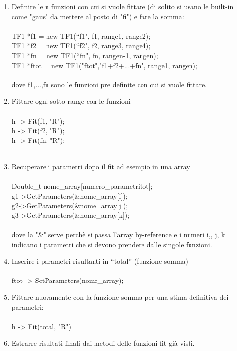 \documentclass[10pt,a4paper]{article}
\begin{document}
\begin{enumerate}
	\item Definire le n funzioni con cui si vuole fittare (di solito si usano le built-in come "gaus" da mettere al posto di "fi") e fare la somma:\\\\
	TF1 *f1 = new TF1(“f1", f1, range1, range2);\\
	TF1 *f2 = new TF1(“f2", f2, range3, range4);\\
	TF1 *fn = new TF1(“fn", fn, rangen-1, rangen);\\
	TF1 *ftot = new TF1("ftot","f1+f2+...+fn", range1, rangen);\\\\
	dove f1,...,fn sono le funzioni pre definite con cui si vuole fittare. 
	\item Fittare ogni sotto-range con le funzioni\\\\
	h -> Fit(f1, "R");\\
	h -> Fit(f2, "R");\\
	h -> Fit(fn, "R");\\\\
	\item Recuperare i parametri dopo il fit ad esempio in una array\\\\
	Double\_t nome\_array[numero\_parametritot];\\
	g1->GetParameters(\&nome\_array[i]);\\
	g2->GetParameters(\&nome\_array[j]);\\
	g3->GetParameters(\&nome\_array[k]);\\\\
	dove la "\&" serve perchè si passa l'array by-reference e i numeri i,, j, k indicano i parametri che si devono prendere dalle singole funzioni. 
	\item Inserire i parametri risultanti in “total” (funzione somma)\\\\
	ftot -> SetParameters(nome\_array);\\
	\item Fittare nuovamente con la funzione somma per una stima definitiva dei parametri:\\\\
	h -> Fit(total, "R")\\
	\item Estrarre risultati finali dai metodi delle funzioni fit già visti.
\end{enumerate}
\end{document}
